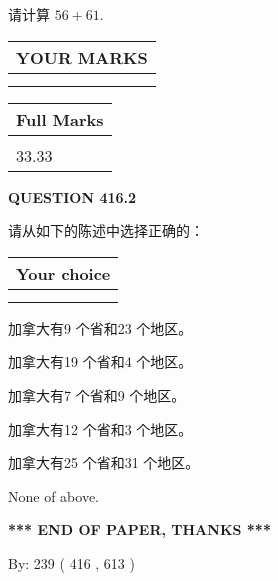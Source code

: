 \documentclass{ctexart}
\begin{document}
  
 
请计算 $ %
56 +  %
61 $.
 

 

 
  
\vspace{0.2in}
  
\noindent\begin{tabular}{|l|}
\hline
 YOUR MARKS  \\
\hline
 \\ 
 \\ 
\hline
\end{tabular}
\hspace{0.05in} \begin{tabular}{|l|}
\hline
 Full Marks  \\
\hline
 \\ 
33.33 \\
\hline
\end{tabular}
{\textbf{\Large{QUESTION
416.2 
}}}
  
  
请从如下的陈述中选择正确的：
  
  
\noindent\hspace{3.0in} \begin{tabular}{|l|}
\hline
Your choice \\
\hline
 \\ 
 \\ 
\hline
\end{tabular}
  
  
 
 
加拿大有9 个省和23 个地区。
 
 
加拿大有19 个省和4 个地区。
 
 
加拿大有7 个省和9 个地区。
 
 
加拿大有12 个省和3 个地区。
 
 
加拿大有25 个省和31 个地区。
 
 
 None of above.
 
 
   
   
 \vspace{0.2in}
 
   
   
   
   
\vspace{1.0in} 
{\textbf{\large{ *** END OF PAPER, THANKS *** }}} 
   
   
\hspace{1.0in} By: 
 239 ( 416 ,  613 )
   
\end{document}
